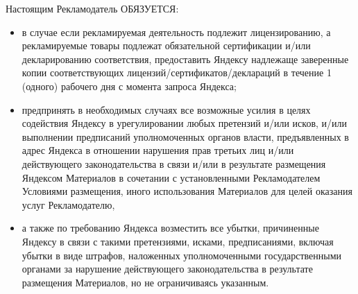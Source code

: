 \noindent
    Настоящим Рекламодатель ОБЯЗУЕТСЯ:
\begin{itemize}
    \item в случае если рекламируемая деятельность подлежит лицензированию, а рекламируемые товары подлежат обязательной сертификации и/или декларированию соответствия, предоставить Яндексу надлежаще заверенные копии соответствующих лицензий/сертификатов/деклараций в течение 1 (одного) рабочего дня с момента запроса Яндекса;
    \item предпринять в необходимых случаях все возможные усилия в целях содействия Яндексу в урегулировании любых претензий и/или исков, и/или выполнении предписаний уполномоченных органов власти, предъявленных в адрес Яндекса в отношении нарушения прав третьих лиц и/или действующего законодательства в связи и/или в результате размещения Яндексом Материалов в сочетании с установленными Рекламодателем Условиями размещения, иного использования Материалов для целей оказания услуг Рекламодателю,
    \item а также по требованию Яндекса возместить все убытки, причиненные Яндексу в связи с такими претензиями, исками, предписаниями, включая убытки в виде штрафов, наложенных уполномоченными государственными органами за нарушение действующего законодательства в результате размещения Материалов, но не ограничиваясь указанным.
\end{itemize}
